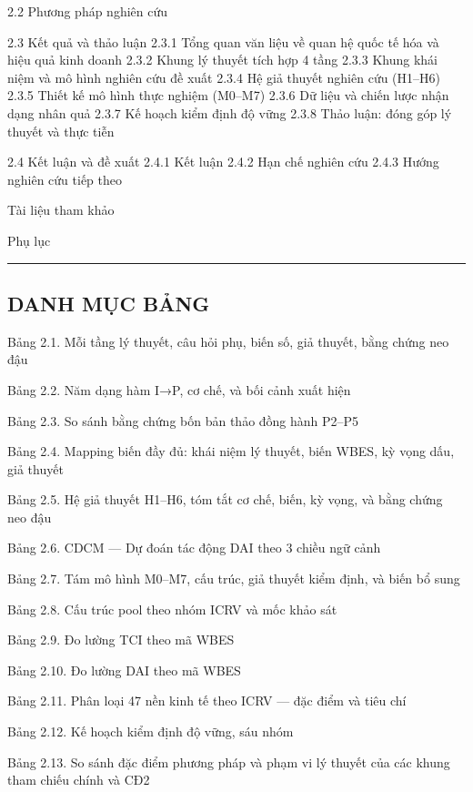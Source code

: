 \documentclass[12pt,a4paper]{article}
\begin{document}
2.2 Phương pháp nghiên cứu

2.3 Kết quả và thảo luận 2.3.1 Tổng quan văn liệu về quan hệ quốc tế hóa
và hiệu quả kinh doanh 2.3.2 Khung lý thuyết tích hợp 4 tầng 2.3.3 Khung
khái niệm và mô hình nghiên cứu đề xuất 2.3.4 Hệ giả thuyết nghiên cứu
(H1--H6) 2.3.5 Thiết kế mô hình thực nghiệm (M0--M7) 2.3.6 Dữ liệu và
chiến lược nhận dạng nhân quả 2.3.7 Kế hoạch kiểm định độ vững 2.3.8
Thảo luận: đóng góp lý thuyết và thực tiễn

2.4 Kết luận và đề xuất 2.4.1 Kết luận 2.4.2 Hạn chế nghiên cứu 2.4.3
Hướng nghiên cứu tiếp theo

Tài liệu tham khảo

Phụ lục

\begin{center}\rule{0.5\linewidth}{0.5pt}\end{center}

\hypertarget{danh-mux1ee5c-bux1ea3ng}{%
\subsection{DANH MỤC BẢNG}\label{danh-mux1ee5c-bux1ea3ng}}

Bảng 2.1. Mỗi tầng lý thuyết, câu hỏi phụ, biến số, giả thuyết, bằng
chứng neo đậu

Bảng 2.2. Năm dạng hàm I→P, cơ chế, và bối cảnh xuất hiện

Bảng 2.3. So sánh bằng chứng bốn bản thảo đồng hành P2--P5

Bảng 2.4. Mapping biến đầy đủ: khái niệm lý thuyết, biến WBES, kỳ vọng
dấu, giả thuyết

Bảng 2.5. Hệ giả thuyết H1--H6, tóm tắt cơ chế, biến, kỳ vọng, và bằng
chứng neo đậu

Bảng 2.6. CDCM --- Dự đoán tác động DAI theo 3 chiều ngữ cảnh

Bảng 2.7. Tám mô hình M0--M7, cấu trúc, giả thuyết kiểm định, và biến bổ
sung

Bảng 2.8. Cấu trúc pool theo nhóm ICRV và mốc khảo sát

Bảng 2.9. Đo lường TCI theo mã WBES

Bảng 2.10. Đo lường DAI theo mã WBES

Bảng 2.11. Phân loại 47 nền kinh tế theo ICRV --- đặc điểm và tiêu chí

Bảng 2.12. Kế hoạch kiểm định độ vững, sáu nhóm

Bảng 2.13. So sánh đặc điểm phương pháp và phạm vi lý thuyết của các
khung tham chiếu chính và CĐ2
\end{document}
